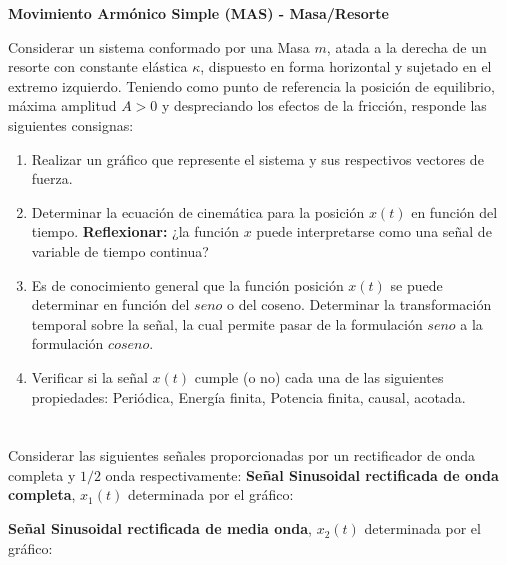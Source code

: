 \documentclass[12pt,a4paper]{report}
\begin{document}
\textbf{Movimiento Armónico Simple (MAS) - Masa/Resorte}

Considerar un sistema conformado por una Masa $m$, atada a la derecha de un resorte con constante elástica $\kappa$, 
dispuesto en forma horizontal y sujetado en el extremo izquierdo. Teniendo como punto de referencia la posición de
equilibrio, máxima amplitud $A > 0$ y despreciando los efectos de la fricción, responde las siguientes consignas:

\begin{enumerate}[label=\alph*)]
  \item Realizar un gráfico que represente el sistema y sus respectivos vectores de fuerza.

  \item Determinar la ecuación de cinemática para la posición $x(t)$ en función del tiempo. \textbf{Reflexionar:} ¿la
    función $x$ puede interpretarse como una señal de variable de tiempo continua?

  \item Es de conocimiento general que la función posición $x(t)$ se puede determinar en función del $seno$ o del 
    coseno. Determinar la transformación temporal sobre la señal, la cual permite pasar de la formulación $seno$ a la 
    formulación $coseno$.

  \item Verificar si la señal $x(t)$ cumple (o no) cada una de las siguientes propiedades: Periódica, Energía finita,
    Potencia finita, causal, acotada.
\end{enumerate}

\chapter{}%
Considerar las siguientes señales proporcionadas por un rectificador de onda completa y $1/2$ onda respectivamente:
\textbf{Señal Sinusoidal rectificada de onda completa}, $x_1(t)$ determinada por el gráfico:


\textbf{Señal Sinusoidal rectificada de media onda}, $x_2(t)$ determinada por el gráfico:

\end{document}
